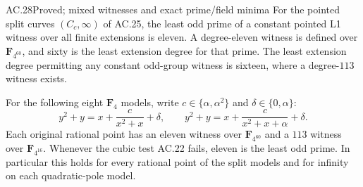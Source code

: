 \begin{claim}{AC.28}{Proved; mixed witnesses and exact prime/field minima}
For the pointed split curves $(C_c,\infty)$ of AC.25, the least
odd prime of a constant pointed L1 witness over all finite extensions
is eleven. A degree-eleven witness is defined over $\mathbf F_{4^{60}}$,
and sixty is the least extension degree for that prime.
The least extension degree permitting any constant odd-group witness
is sixteen, where a degree-$113$ witness exists.

For the following eight $\mathbf F_4$ models, write
$c\in\{\alpha,\alpha^2\}$ and $\delta\in\{0,\alpha\}$:
\[
 y^2+y=x+\frac{c}{x^2+x}+\delta,\qquad
 y^2+y=x+\frac{c}{x^2+x+\alpha}+\delta.
\]
Each original rational point has an eleven witness over
$\mathbf F_{4^{60}}$ and a $113$ witness over $\mathbf F_{4^{16}}$.
Whenever the cubic test AC.22 fails, eleven is the least odd prime.
In particular this holds for every rational point of the split
models and for infinity on each quadratic-pole model.
\end{claim}
